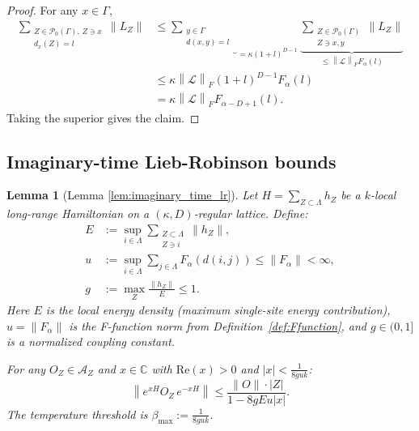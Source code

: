 \documentclass[11pt]{article}
\numberwithin{equation}{section}
\numberwithin{figure}{section}
\numberwithin{table}{section}
\theoremstyle{definition}
\theoremstyle{plain}
\newtheorem{lem}[thm]{Lemma}
\theoremstyle{remark}
\newcommand{\Li}{\mathcal{L}}
\newcommand{\A}{\mathcal{A}}
\newcommand{\G}{\Gamma}
\newcommand{\norm}[1]{\left\lVert#1\right\rVert}
\newcommand{\normm}[2]{\left\lVert#1\right\rVert_{#2}}
\newcommand{\abs}[1]{\left \vert#1\right\vert}
\begin{document}
\begin{proof}For any $x\in \G$,
\begin{align}
\sum_{\substack{
    Z\in\mathcal{P}_0(\Gamma),\, Z\ni x \\
    d_x(Z)= l
}}
\norm{L_Z}
&\leq
\underbrace{
    \sum_{\substack{
        y\in\G \\
        d(x,y)=l
    }}
}_{=\kappa (1+l)^{D-1}}
\underbrace{
    \sum_{\substack{
        Z\in\mathcal{P}_0(\Gamma) \\
        Z\ni x,y
    }}
    \norm{L_Z}
}_{\leq \normm{\Li}{F} F_\alpha (l)}
\\
&\leq
\kappa \normm{\Li}{F}
(1+l)^{D-1}
F_\alpha (l)
\nonumber\\
&=
\kappa \normm{\Li}{F}
F_{\alpha -D+1}(l).
\nonumber
\end{align}
Taking the superior gives the claim.
\end{proof}



\subsection{Imaginary-time Lieb-Robinson bounds}
\begin{lem}[Lemma \ref{lem:imaginary_time_lr}]
\label{lem:imaginary_time_lr_appendix}
Let $H = \sum_{Z \subset \Lambda} h_Z$ be a $k$-local long-range Hamiltonian 
on a $(\kappa, D)$-regular lattice. Define:
\begin{align}
    E &:= \sup_{i \in \Lambda}\sum_{\substack{Z \subset \Lambda \\ Z \ni i}} 
    \|h_Z\|, \label{eq:local_energy}\\
    u &:= \sup_{i \in \Lambda} \sum_{j \in \Lambda} F_\alpha(d(i,j)) 
    \leq \|F_\alpha\| < \infty, \label{eq:u_def}\\
    g &:= \max_{Z} \frac{\|h_Z\|}{E} \leq 1. \label{eq:g_def}
\end{align}
Here $E$ is the local energy density (maximum single-site energy contribution), 
$u = \|F_\alpha\|$ is the F-function norm from Definition~\ref{def:Ffunction}, 
and $g \in (0,1]$ is a normalized coupling constant.

For any $O_Z \in \A_Z$ and $x \in \mathbb{C}$ with 
$\mathrm{Re}(x) > 0$ and $|x| < \frac{1}{8guk}$:
\begin{equation}
    \left\|e^{xH} O_Z\, e^{-xH}\right\| \leq \frac{\|O\|\cdot \abs{Z}}{1 - 8gEu|x|}.
    \label{eq:imag_lr}
\end{equation}
The temperature threshold is $\beta_{\max} := \frac{1}{8guk}$.
\end{lem}
\end{document}
